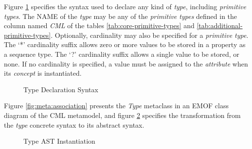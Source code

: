 Figure \ref{fig:stx:type} specifies the syntax used
to declare any kind of \emph{type},
including \emph{primitive types}.
The NAME of the \emph{type} may be any of the \emph{primitive types}
defined in the column named \emph{CML}
of the tables \ref{tab:core-primitive-types} and \ref{tab:additional-primitive-types}.
Optionally, cardinality may also be specified
for a \emph{primitive type}.
The `*' cardinality suffix allows zero or more values to be stored
in a property as a sequence type.
The `?' cardinality suffix allows a single value to be stored, or none.
If no cardinality is specified,
a value must be assigned to the \emph{attribute}
when its \emph{concept} is instantiated.

\begin{figure}
\verbatimfont{\small}

\caption{Type Declaration Syntax}
\label{fig:stx:type}
\end{figure}

Figure \ref{fig:meta:association} presents the \emph{Type} metaclass
in an EMOF \cite{mof} class diagram of the CML metamodel,
and figure \ref{fig:ast:type} specifies
the transformation
from the \emph{type} concrete syntax to its abstract syntax.

\begin{figure}
\verbatimfont{\small}

\caption{Type AST Instantiation}
\label{fig:ast:type}
\end{figure}
